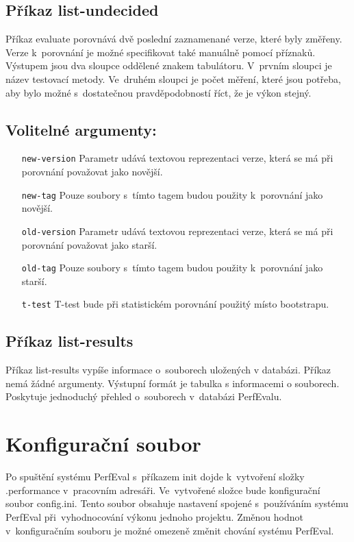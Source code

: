 \subsection{Příkaz list-undecided}

Příkaz evaluate porovnává dvě poslední zaznamenané verze, které byly změřeny.
Verze k~porovnání je možné specifikovat také manuálně pomocí příznaků. Výstupem
jsou dva sloupce oddělené znakem tabulátoru. V~prvním sloupci je název testovací metody.
Ve~druhém sloupci je počet měření, které jsou potřeba, aby bylo možné s~dostatečnou
pravděpodobností říct, že je výkon stejný.

\subsection*{Volitelné argumenty:}
\begin{itemize}[label=\texttt{\textbf{\textendash}}]
    \item[\texttt{new-version}] Parametr udává textovou reprezentaci verze, která se má při porovnání považovat jako novější.
    \item[\texttt{new-tag}]     Pouze soubory s~tímto tagem budou použity k~porovnání jako novější.
    \item[\texttt{old-version}] Parametr udává textovou reprezentaci verze, která se má při porovnání považovat jako starší.
    \item[\texttt{old-tag}]     Pouze soubory s~tímto tagem budou použity k~porovnání jako starší.
    \item[\texttt{t-test}]      T-test bude při statistickém porovnání použitý místo bootstrapu.
\end{itemize}

\subsection{Příkaz list-results}

Příkaz list-results vypíše informace o~souborech uložených v databázi. Příkaz nemá
žádné argumenty. Výstupní formát je tabulka s informacemi o souborech. Poskytuje jednoduchý
přehled o~souborech v~databázi PerfEvalu.

\section{Konfigurační soubor}

Po spuštění systému PerfEval s~příkazem init dojde k~vytvoření složky .performance
v~pracovním adresáři. Ve~vytvořené složce bude konfigurační soubor config.ini.
Tento soubor obsahuje nastavení spojené s~používáním systému PerfEval při~vyhodnocování
výkonu jednoho projektu. Změnou hodnot v~konfiguračním souboru je možné omezeně změnit chování
systému PerfEval.

